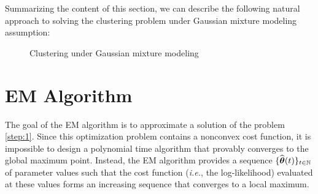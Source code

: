 Summarizing the content of this section, we can describe the following  natural approach to solving the clustering problem under Gaussian
mixture modeling assumption:
\begin{figure}[H]
\begin{center}
   \caption{Clustering under Gaussian mixture modeling}
   \label{algo:general}
\end{center}
\vspace{-15pt}
\end{figure}


\section{EM Algorithm}

The goal of the EM algorithm is to approximate a solution of the problem \eqref{step:1}.
Since this optimization problem contains a nonconvex cost function, it is impossible to
design a polynomial time algorithm that provably converges to the global maximum point. Instead,
the EM algorithm provides a sequence $\{\widehat{{\boldsymbol\theta}}(t)\}_{t\in{\mathbb N}}$ of parameter values such that
the cost function (\textit{i.e.}, the log-likelihood) evaluated at these values forms an
increasing sequence that converges to a local maximum.


